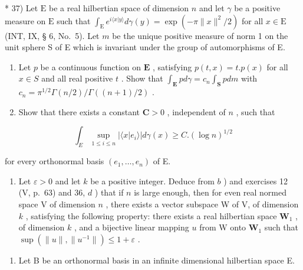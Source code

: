 * 37) Let \(\mathrm{E}\) be a real hilbertian space of dimension \(n\) and let \(\gamma\) be a positive measure on \(\mathrm{E}\) such that \(\int_{\mathrm{E}} e^{i\langle x|y\rangle} d\gamma(y) = \exp(-\pi \|x\|^2/2)\) for all \(x \in \mathrm{E}\) (INT, IX, § 6, No.~5). Let \(m\) be the unique positive measure of norm 1 on the unit sphere S of E which is invariant under the group of automorphisms of E.

\begin{enumerate}
\def\labelenumi{\alph{enumi})}
\item
  Let \(p\) be a continuous function on \(\mathbf{E}\) , satisfying \(p(t,x) = t.p(x)\) for all \(x\in S\) and all real positive \(t\) . Show that \(\int_{\mathbf{E}}pd\gamma = c_n\int_{\mathbf{S}}pdm\) with \(c_{n} = \pi^{1 / 2}\Gamma (n / 2) / \Gamma ((n + 1) / 2)\) .
\item
  Show that there exists a constant \(\mathbf{C} > 0\) , independent of \(n\) , such that
\end{enumerate}

\[
\int_ {E} \sup _ {1 \leqslant i \leqslant n} | \langle x | e _ {i} \rangle | d \gamma (x) \geqslant C. (\log n) ^ {1 / 2}
\]

for every orthonormal basis \((e_1, \dots, e_n)\) of E.

\begin{enumerate}
\def\labelenumi{\alph{enumi})}
\setcounter{enumi}{2}
\tightlist
\item
  Let \(\varepsilon > 0\) and let \(k\) be a positive integer. Deduce from \(b\) ) and exercises 12 (V, p.~63) and 36, \(d\) ) that if \(n\) is large enough, then for even real normed space V of dimension \(n\) , there exists a vector subspace W of V, of dimension \(k\) , satisfying the following property: there exists a real hilbertian space \(\mathbf{W}_1\) , of dimension \(k\) , and a bijective linear mapping \(u\) from W onto \(\mathbf{W}_1\) such that \(\sup (\| u \|, \| u^{-1} \|) \leqslant 1 + \varepsilon\) .
\end{enumerate}

\exercisegroup

\begin{enumerate}
\def\labelenumi{\arabic{enumi})}
\tightlist
\item
  Let B be an orthonormal basis in an infinite dimensional hilbertian space E.
\end{enumerate}

